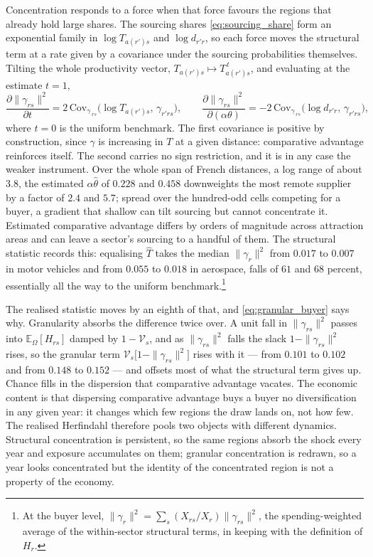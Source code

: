 Concentration responds to a force when that force favours the regions that already hold large shares. The sourcing shares \eqref{eq:sourcing_share} form an exponential family in $\log T_{a(r')s}$ and $\log d_{r'r}$, so each force moves the structural term at a rate given by a covariance under the sourcing probabilities themselves. Tilting the whole productivity vector, $T_{a(r')s}\mapsto T_{a(r')s}^{\,t}$, and evaluating at the estimate $t=1$,
$$\frac{\partial \|\gamma_{rs}\|^{2}}{\partial t}=2\,\mathrm{Cov}_{\gamma_{\cdot rs}}\big(\log T_{a(r')s},\,\gamma_{r'rs}\big),
\qquad
\frac{\partial \|\gamma_{rs}\|^{2}}{\partial (\alpha\theta)}=-2\,\mathrm{Cov}_{\gamma_{\cdot rs}}\big(\log d_{r'r},\,\gamma_{r'rs}\big),$$
where $t=0$ is the uniform benchmark. The first covariance is positive by construction, since $\gamma$ is increasing in $T$ at a given distance: comparative advantage reinforces itself. The second carries no sign restriction, and it is in any case the weaker instrument. Over the whole span of French distances, a log range of about $3.8$, the estimated $\alpha\hat\theta$ of $0.228$ and $0.458$ downweights the most remote supplier by a factor of $2.4$ and $5.7$; spread over the hundred-odd cells competing for a buyer, a gradient that shallow can tilt sourcing but cannot concentrate it. Estimated comparative advantage differs by orders of magnitude across attraction areas and can leave a sector's sourcing to a handful of them. The structural statistic records this: equalising $\hat T$ takes the median $\|\gamma_{r}\|^{2}$ from $0.017$ to $0.007$ in motor vehicles and from $0.055$ to $0.018$ in aerospace, falls of $61$ and $68$ percent, essentially all the way to the uniform benchmark.\footnote{At the buyer level, $\|\gamma_{r}\|^{2}=\sum_{s}(X_{rs}/X_{r})\|\gamma_{rs}\|^{2}$, the spending-weighted average of the within-sector structural terms, in keeping with the definition of $H_{r}$.}

The realised statistic moves by an eighth of that, and \eqref{eq:granular_buyer} says why. Granularity absorbs the difference twice over. A unit fall in $\|\gamma_{rs}\|^{2}$ passes into $\mathbb{E}_{\Omega}[H_{rs}]$ damped by $1-\mathcal{V}_{s}$, and as $\|\gamma_{rs}\|^{2}$ falls the slack $1-\|\gamma_{rs}\|^{2}$ rises, so the granular term $\mathcal{V}_{s}\big[1-\|\gamma_{rs}\|^{2}\big]$ rises with it --- from $0.101$ to $0.102$ and from $0.148$ to $0.152$ --- and offsets most of what the structural term gives up. Chance fills in the dispersion that comparative advantage vacates. The economic content is that dispersing comparative advantage buys a buyer no diversification in any given year: it changes which few regions the draw lands on, not how few. The realised Herfindahl therefore pools two objects with different dynamics. Structural concentration is persistent, so the same regions absorb the shock every year and exposure accumulates on them; granular concentration is redrawn, so a year looks concentrated but the identity of the concentrated region is not a property of the economy.

